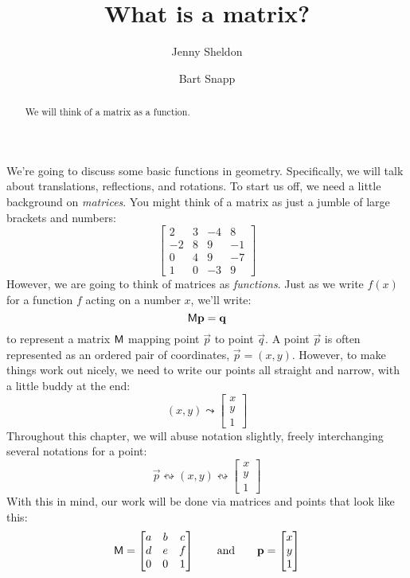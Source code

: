 \documentclass{ximera}
\title{What is a matrix?}
\author{Jenny Sheldon \and Bart Snapp}
\begin{document}
\begin{abstract}
  We will think of a matrix as a function.
\end{abstract}
\maketitle

We're going to discuss some basic functions in geometry.
Specifically, we will talk about translations, reflections, and
rotations. To start us off, we need a little background on
\textit{matrices}. You might think of a matrix as just a jumble
of large brackets and numbers:
\[
\begin{bmatrix}
  2 & 3 & -4 & 8 \\
  -2 & 8 & 9 & -1 \\
  0 & 4 & 9 & -7\\
  1 & 0  & -3 & 9
\end{bmatrix}
\]
However, we are going to think of
matrices as \textit{functions}. Just as we write $f(x)$ for a function
$f$ acting on a number $x$, we'll write:
\[
\mathsf{M} \mathbf{p} = \mathbf{q} 
\]
to represent a matrix $\mathsf{M}$ mapping point $\vec{p}$ to point
$\vec{q}$. A point $\vec p$ is often represented as an ordered pair of
coordinates, $\vec{p} = (x,y)$. However, to make things work out
nicely, we need to write our points all straight and narrow, with a
little buddy at the end:
\[
(x,y) \leadsto \begin{bmatrix} 
x \\ 
y \\
1
\end{bmatrix}
\]
Throughout this chapter, we will abuse notation slightly, freely
interchanging several notations for a point:
\[
\vec{p} \leftrightsquigarrow
(x,y) \leftrightsquigarrow
\begin{bmatrix} 
x \\ 
y \\
1
\end{bmatrix}
\]
With this in mind, our work will be done via matrices and
points that look like this:
\[
\mathsf{M} = 
\begin{bmatrix}
a & b & c \\ 
d & e & f \\
0 & 0 & 1
\end{bmatrix}\qquad\text{and}\qquad \mathbf{p} = 
\begin{bmatrix}
x \\
y \\
1
\end{bmatrix}
\]
\end{document}
